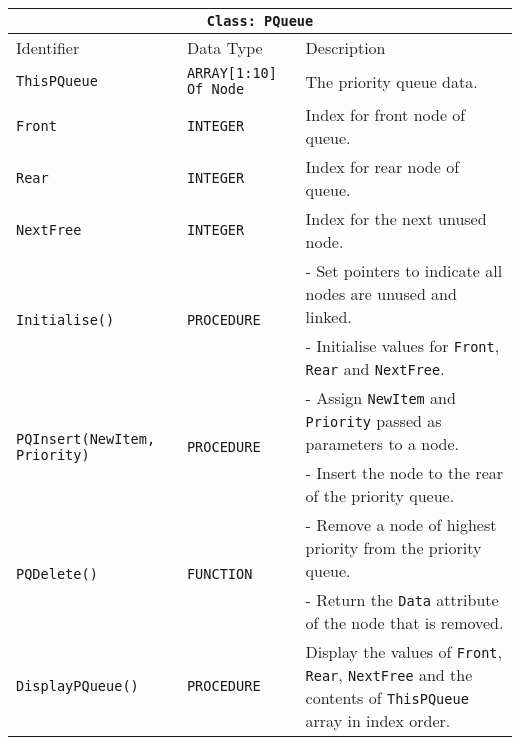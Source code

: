 \begin{center}
\begin{tabular}{|l|l|l|}
\hline 
\multicolumn{3}{|c|}{\texttt{Class: PQueue}}\tabularnewline
\hline 
\texttt{\hspace{0.01\columnwidth}}Identifier & \texttt{\hspace{0.01\columnwidth}}Data Type & \texttt{\hspace{0.05\columnwidth}}Description\tabularnewline
\hline 
\texttt{ThisPQueue} & \texttt{ARRAY{[}1:10{]} Of Node} & The priority queue data.\tabularnewline
\hline 
\texttt{Front} & \texttt{INTEGER} & Index for front node of queue.\tabularnewline
\hline 
\texttt{Rear} & \texttt{INTEGER} & Index for rear node of queue.\tabularnewline
\hline 
\texttt{NextFree} & \texttt{INTEGER} & Index for the next unused node.\tabularnewline
\hline 
\multirow{2}{*}{\texttt{Initialise()}} & \multirow{2}{*}{\texttt{PROCEDURE}} & - Set pointers to indicate all nodes are unused and linked. \tabularnewline
 &  & - Initialise values for \texttt{Front}, \texttt{Rear} and \texttt{NextFree}.\tabularnewline
\hline 
\multirow{2}{*}{\texttt{PQInsert(NewItem, Priority)}} & \multirow{2}{*}{\texttt{PROCEDURE}} & - Assign \texttt{NewItem} and \texttt{Priority} passed as parameters
to a node.\tabularnewline
 &  & - Insert the node to the rear of the priority queue.\tabularnewline
\hline 
\multirow{2}{*}{\texttt{PQDelete()}} & \multirow{2}{*}{\texttt{FUNCTION}} & - Remove a node of highest priority from the priority queue.\tabularnewline
 &  & - Return the \texttt{Data} attribute of the node that is removed.\tabularnewline
\hline 
\texttt{DisplayPQueue()} & \texttt{PROCEDURE} & Display the values of \texttt{Front}, \texttt{Rear}, \texttt{NextFree}
and the contents of \texttt{ThisPQueue} array in index order.\tabularnewline
\hline 
\end{tabular}
\par\end{center}

